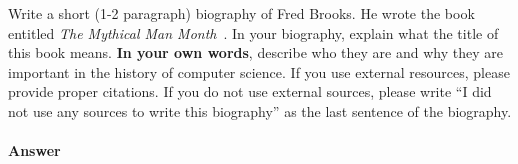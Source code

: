 \documentclass{article}
\begin{document}
\collab{\todo{}}

Write a short (1-2 paragraph) biography of Fred Brooks.  He wrote the book
entitled \emph{The Mythical Man Month}~\cite{brooks-manmonth}.  In your
biography, explain what the title of this book means.
\textbf{In your own words}, describe who they are and why they are important in
the history of computer science.  If you use external resources, please provide
proper citations. If you do not use external sources, please write ``I did not
use any sources to write this biography'' as the last sentence of the
biography.

\paragraph{Answer}


\newpage


\end{document}
